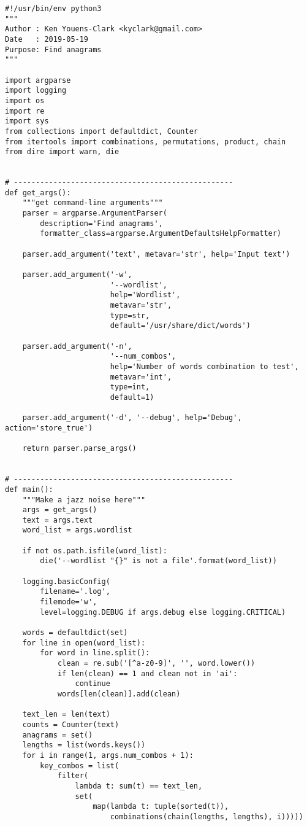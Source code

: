 \documentclass[]{article}
\begin{document}
\begin{verbatim}
#!/usr/bin/env python3
"""
Author : Ken Youens-Clark <kyclark@gmail.com>
Date   : 2019-05-19
Purpose: Find anagrams
"""

import argparse
import logging
import os
import re
import sys
from collections import defaultdict, Counter
from itertools import combinations, permutations, product, chain
from dire import warn, die


# --------------------------------------------------
def get_args():
    """get command-line arguments"""
    parser = argparse.ArgumentParser(
        description='Find anagrams',
        formatter_class=argparse.ArgumentDefaultsHelpFormatter)

    parser.add_argument('text', metavar='str', help='Input text')

    parser.add_argument('-w',
                        '--wordlist',
                        help='Wordlist',
                        metavar='str',
                        type=str,
                        default='/usr/share/dict/words')

    parser.add_argument('-n',
                        '--num_combos',
                        help='Number of words combination to test',
                        metavar='int',
                        type=int,
                        default=1)

    parser.add_argument('-d', '--debug', help='Debug', action='store_true')

    return parser.parse_args()


# --------------------------------------------------
def main():
    """Make a jazz noise here"""
    args = get_args()
    text = args.text
    word_list = args.wordlist

    if not os.path.isfile(word_list):
        die('--wordlist "{}" is not a file'.format(word_list))

    logging.basicConfig(
        filename='.log',
        filemode='w',
        level=logging.DEBUG if args.debug else logging.CRITICAL)

    words = defaultdict(set)
    for line in open(word_list):
        for word in line.split():
            clean = re.sub('[^a-z0-9]', '', word.lower())
            if len(clean) == 1 and clean not in 'ai':
                continue
            words[len(clean)].add(clean)

    text_len = len(text)
    counts = Counter(text)
    anagrams = set()
    lengths = list(words.keys())
    for i in range(1, args.num_combos + 1):
        key_combos = list(
            filter(
                lambda t: sum(t) == text_len,
                set(
                    map(lambda t: tuple(sorted(t)),
                        combinations(chain(lengths, lengths), i)))))


\end{verbatim}
\end{document}
